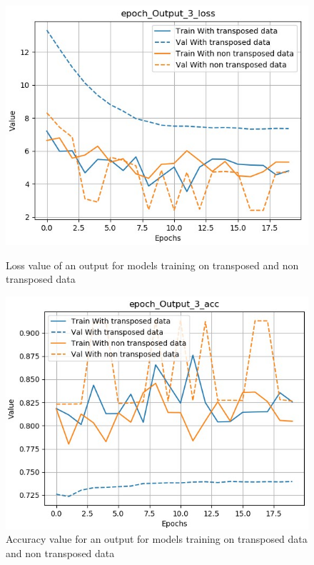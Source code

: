\documentclass[12pt]{report}
\begin{document}
\begin{figure}[htbp]
    \begin{minipage}{0.5\textwidth}
        \begin{center}
            \includegraphics[width=\textwidth]{images/experiences/transpose-rnn/loss-output-comparison-transpose.jpg}
            \caption{Loss value of an output for models training on transposed and non transposed data}
            \label{fig:loss-output-comparison-transpose}
        \end{center}
    \end{minipage} \hfill
    \begin{minipage}{0.5 \textwidth}
        \begin{center}
            \includegraphics[width=\textwidth]{images/experiences/transpose-rnn/acc-output-comparison-transpose.jpg}
            \caption{Accuracy value for an output for models training on transposed data and non transposed data}
            \label{fig:acc-output-comparison-transpose}
        \end{center}
    \end{minipage}
\end{figure}
\end{document}
